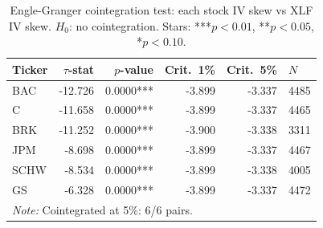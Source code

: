 \begin{table}[htbp]
\centering
\small
\caption{Engle-Granger cointegration test: each stock IV skew vs XLF IV skew. $H_0$: no cointegration. Stars: ***$p<0.01$, **$p<0.05$, *$p<0.10$.}
\label{tab:coint_sector}
\begin{tabular}{lrrrrl}
\toprule
Ticker & $\tau$-stat & $p$-value & Crit.\ 1\% & Crit.\ 5\% & $N$ \\
\midrule
BAC & -12.726 & 0.0000*** & -3.899 & -3.337 & 4485 \\
C & -11.658 & 0.0000*** & -3.899 & -3.337 & 4465 \\
BRK & -11.252 & 0.0000*** & -3.900 & -3.338 & 3311 \\
JPM & -8.698 & 0.0000*** & -3.899 & -3.337 & 4467 \\
SCHW & -8.534 & 0.0000*** & -3.899 & -3.338 & 4005 \\
GS & -6.328 & 0.0000*** & -3.899 & -3.337 & 4472 \\
\bottomrule
\multicolumn{6}{l}{\textit{Note: } Cointegrated at 5\%: 6/6 pairs.} \\
\end{tabular}
\end{table}